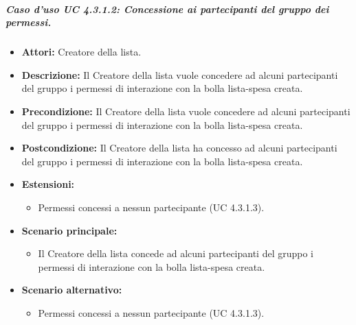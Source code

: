 \subparagraph{Caso d'uso UC 4.3.1.2: Concessione ai partecipanti del gruppo dei permessi.}
\label{Caso d'uso UC 4.3.1.2: Concessione ai partecipanti del gruppo dei permessi.}

\FloatBarrier
\begin{itemize}
\item \textbf{Attori:} Creatore della lista.
\item \textbf{Descrizione:} Il Creatore della lista vuole concedere ad alcuni partecipanti del gruppo i permessi di interazione con la bolla lista-spesa creata.
\item \textbf{Precondizione:} Il Creatore della lista vuole concedere ad alcuni partecipanti del gruppo i permessi di interazione con la bolla lista-spesa creata. 
\item \textbf{Postcondizione:} Il Creatore della lista ha concesso ad alcuni partecipanti del gruppo i permessi di interazione con la bolla lista-spesa creata.
\item \textbf{Estensioni:}
	\begin{itemize}
	\item{Permessi concessi a nessun partecipante (UC 4.3.1.3).}
	\end{itemize}
\item \textbf{Scenario principale:}
\begin{itemize}
\item Il Creatore della lista concede ad alcuni partecipanti del gruppo i permessi di interazione con la bolla lista-spesa creata.
\end{itemize}
\item \textbf{Scenario alternativo:}
	\begin{itemize}
	\item{Permessi concessi a nessun partecipante (UC 4.3.1.3).}
	\end{itemize}
\end{itemize}